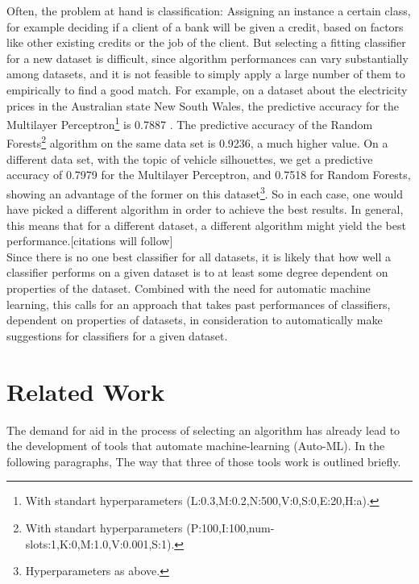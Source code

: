 \documentclass[12pt]{scrartcl}
\begin{document}
Often, the problem at hand is classification: Assigning an instance a certain class, for example deciding if a client of a bank will be given a credit, based on factors like other existing credits or the  job of the client. But selecting a fitting classifier for a new dataset is difficult, since algorithm performances can vary substantially among datasets, and it is not feasible to simply apply a large number of them to empirically to find a good match. For example, on a dataset about the electricity prices in the Australian state New South Wales, %
 the predictive accuracy for the Multilayer Perceptron\footnote{With standart hyperparameters (L:0.3,M:0.2,N:500,V:0,S:0,E:20,H:a).} is 0.7887 %
. The predictive accuracy of the Random Forests\footnote{With standart hyperparameters (P:100,I:100,num-slots:1,K:0,M:1.0,V:0.001,S:1).} algorithm on the same data set is 0.9236, a much higher value. %
On a different data set, with the topic of vehicle silhouettes, %
 we get a predictive accuracy of 0.7979 %
 for the Multilayer Perceptron, and 0.7518 %
 for Random Forests, showing an advantage of the former on this dataset\footnote{Hyperparameters as above.}. So in each case, one would have picked a different algorithm in order to achieve the best results. In general, this means that for a different dataset, a different algorithm might yield the best performance.[citations will follow]\\
 
Since there is no one best classifier for all datasets, it is likely that how well a classifier performs on a given dataset is to at least some degree dependent on properties of the dataset. Combined with the need for automatic machine learning, this calls for an approach that takes past performances of classifiers, dependent on properties of datasets, in consideration to automatically make suggestions for classifiers for a given dataset.

\section{Related Work}\label{sec:related_work}
The demand for aid in the process of selecting an algorithm has already lead to the development of tools that automate machine-learning (Auto-ML). In the following paragraphs, The way that three of those tools work is outlined briefly.\\
\end{document}
